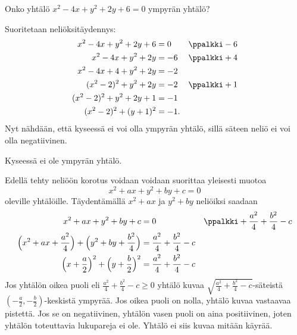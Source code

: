 \begin{esimerkki}
Onko yhtälö $x^2-4x+y^2+2y+6=0$ ympyrän yhtälö?
\begin{esimratk}
Suoritetaan neliöksitäydennys:
\begin{align*}
x^2-4x+y^2+2y+6&=0 && \ppalkki -6\\
x^2-4x+y^2+2y&=-6 && \ppalkki +4\\
x^2-4x+4+y^2+2y&=-2 && \\
(x^2-2)^2+y^2+2y&=-2 && \ppalkki +1\\
(x^2-2)^2+y^2+2y+1&=-1 && \\
(x^2-2)^2+(y+1)^2&=-1. &&
\end{align*}
Nyt nähdään, että kyseessä ei voi olla ympyrän yhtälö, sillä säteen neliö ei voi olla negatiivinen.
\end{esimratk}
\begin{esimvast}
Kyseessä ei ole ympyrän yhtälö.
\end{esimvast}
\end{esimerkki}

Edellä tehty neliöön korotus voidaan voidaan suorittaa yleisesti muotoa
\[
x^2+ax+y^2+by+c = 0
\]
oleville yhtälöille. Täydentämällä $x^2+ax$ ja $y^2+by$ neliöiksi saadaan
\begin{align*}
x^2+ax+y^2+by+c &= 0 && \ppalkki +\frac{a^2}{4}+\frac{b^2}{4}-c \\
\Big(x^2+ax+\frac{a^2}{4}\Big)+\Big(y^2+by+\frac{b^2}{4}\Big) &= \frac{a^2}{4}+\frac{b^2}{4}-c  \\
\Big(x+\frac{a}{2}\Big)^2+\Big(y+\frac{b}{2}\Big)^2 &= \frac{a^2}{4}+\frac{b^2}{4}-c
\end{align*}
Jos yhtälön oikea puoli eli $\frac{a^2}{4}+\frac{b^2}{4}-c \geq 0$ yhtälö kuvaa $\sqrt{\frac{a^2}{4}+\frac{b^2}{4}-c}$-säteistä $(-\frac{a}{2}, -\frac{b}{2})$-keskistä ympyrää. Jos oikea puoli on nolla, yhtälö kuvaa vastaavaa pistettä. Jos se on negatiivinen, yhtälön vasen puoli on aina positiivinen, joten yhtälön toteuttavia lukupareja ei ole. Yhtälö ei siis kuvaa mitään käyrää.


